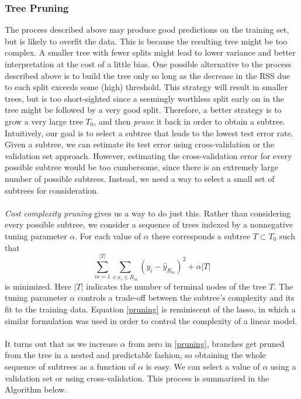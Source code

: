 \subsubsection{Tree Pruning}
The process described above may produce good predictions on the training set, but is likely to overfit the data. This is because the resulting tree might be too complex. A smaller tree with fewer splits might lead to lower variance and better interpretation at the cost of a little bias. One possible alternative to the process described above is to build the tree only so long as the decrease in the RSS due to each split exceeds some (high) threshold. This strategy will result in smaller trees, but is too short-sighted since a seemingly worthless split early on in the tree might be followed by a very good split. Therefore, a better strategy is to grow a very large tree $T_0$, and then \textit{prune} it back in order to obtain a subtree. Intuitively, our goal is to select a subtree that leads to the lowest test error rate. Given a subtree, we can estimate its test error using cross-validation or the validation set approach. However, estimating the cross-validation error for every possible subtree would be too cumbersome, since there is an extremely large number of possible subtrees. Instead, we need a way to select a small set of subtrees for consideration.\\\\
\textit{Cost complexity pruning} gives us a way to do just this. Rather than considering every possible subtree, we consider a sequence of trees indexed by a nonnegative tuning parameter $\alpha$. For each value of $\alpha$ there corresponds a subtree $T \subset T_0$ such that
\begin{equation}
    \sum_{m=1}^{|T|}\sum_{i:x_i \in R_m}(y_i - \hat{y}_{R_m})^2 + \alpha|T|
    \label{pruning}
\end{equation}
is minimized. Here $|T|$ indicates the number of terminal nodes of the tree $T$. The tuning parameter $\alpha$ controls a trade-off between the subtree’s complexity and its fit to the training data. Equation \ref{pruning} is reminiscent of the lasso, in which a similar formulation was used in order to control the complexity of a linear model.\\\\
It turns out that as we increase $\alpha$ from zero in \ref{pruning}, branches get pruned from the tree in a nested and predictable fashion, so obtaining the whole sequence of subtrees as a function of $\alpha$ is easy. We can select a value of $\alpha$ using a validation set or using cross-validation. This process is summarized in the Algorithm below.
